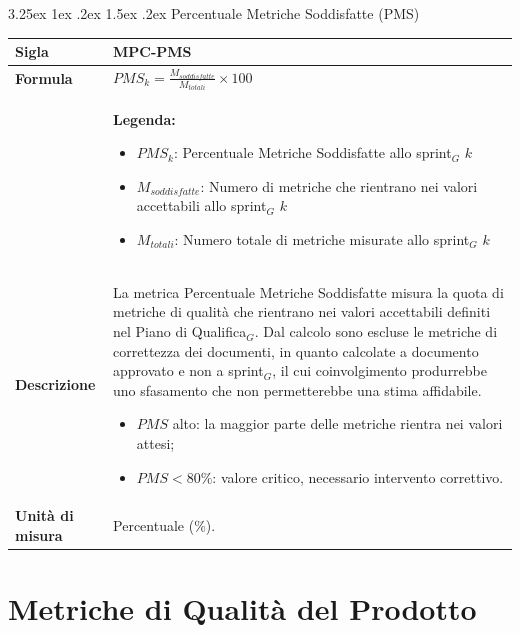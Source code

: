\documentclass[a4paper, 10pt]{article}
\makeatletter
\renewcommand\paragraph{\@startsection{paragraph}{4}{\z@}%
  {3.25ex \@plus1ex \@minus .2ex}%
  {1.5ex \@plus .2ex}%
  {\normalfont\normalsize\bfseries}}
\makeatother
\begin{document}
\paragraph{Percentuale Metriche Soddisfatte (PMS)}
\mbox{} \\
\noindent
\begin{minipage}{\textwidth}
    \begin{tabularx}{\textwidth}{|>{\columncolor{bluBitless!10}\bfseries}p{3.5cm}|X|}
        \hline
        Sigla & MPC-PMS \\ \hline
        Formula &
        \textit{$PMS_{k} = \frac{M_{soddisfatte}}{M_{totali}} \times 100$} \vspace{2mm} \\
        & \small \textbf{Legenda:}
        \begin{itemize}
            \item $PMS_{k}$: Percentuale Metriche Soddisfatte allo sprint$_G$ $k$
            \item $M_{soddisfatte}$: Numero di metriche che rientrano nei valori accettabili allo sprint$_G$ $k$
            \item $M_{totali}$: Numero totale di metriche misurate allo sprint$_G$ $k$
        \end{itemize} \\ \hline
        Descrizione & La metrica Percentuale Metriche Soddisfatte misura la quota di metriche di qualità che rientrano nei valori accettabili definiti nel Piano di Qualifica$_G$. Dal calcolo sono escluse le metriche di correttezza dei documenti, in quanto calcolate a documento approvato e non a sprint$_G$, il cui coinvolgimento produrrebbe uno sfasamento che non permetterebbe una stima affidabile.
        \begin{itemize}
            \item $PMS$ alto: la maggior parte delle metriche rientra nei valori attesi;
            \item $PMS < 80\%$: valore critico, necessario intervento correttivo.
        \end{itemize} \\ \hline
        Unità di misura & Percentuale (\%). \\ \hline
    \end{tabularx}
\end{minipage}

\section{Metriche di Qualità del Prodotto}
\end{document}
